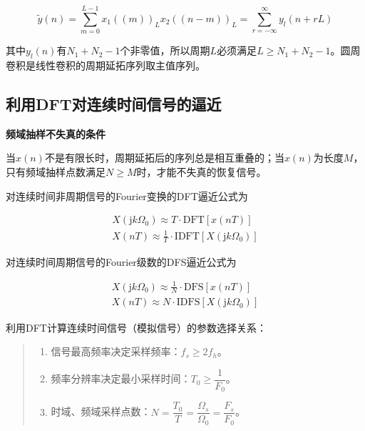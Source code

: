 \documentclass[cn, hazy, blue, normal, 12pt]{elegantnote}
\begin{document}
\begin{equation}
    \widetilde{y}(n)=\sum_{m=0}^{L-1}{x_1((m))_L x_2((n-m))_L}=\sum_{r=-\infty}^{\infty}{y_l(n+rL)}
\end{equation}

其中$y_l(n)$有$N_1+N_2-1$个非零值，所以周期$L$必须满足$L\geq N_1+N_2-1$。圆周卷积是线性卷积的周期延拓序列取主值序列。

\subsection{利用DFT对连续时间信号的逼近}

\textbf{频域抽样不失真的条件}

当$x(n)$不是有限长时，周期延拓后的序列总是相互重叠的；当$x(n)$为长度$M$，只有频域抽样点数满足$N\geq M$时，才能不失真的恢复信号。

对连续时间非周期信号的Fourier变换的DFT逼近公式为

\begin{equation}
\begin{aligned}
    X(\text{j}k\Omega_0)\approx T\cdot \text{DFT}[x(nT)] \\
    X(nT)\approx \frac{1}{T}\cdot \text{IDFT}[X(\text{j}k\Omega_0)]
\end{aligned}
\end{equation}

对连续时间周期信号的Fourier级数的DFS逼近公式为

\begin{equation}
\begin{aligned}
    X(\text{j}k\Omega_0)\approx \frac{1}{N}\cdot \text{DFS}[x(nT)] \\
    X(nT)\approx N\cdot \text{IDFS}[X(\text{j}k\Omega_0)]
\end{aligned}
\end{equation}

利用DFT计算连续时间信号（模拟信号）的参数选择关系：

\begin{quote}
\begin{enumerate}
    \item 信号最高频率决定采样频率：$f_s\geq 2f_h$。
    \item 频率分辨率决定最小采样时间：$T_0\geq \dfrac{1}{F_0}$。
    \item 时域、频域采样点数：$N=\dfrac{T_0}{T}=\dfrac{\Omega_s}{\Omega_0}=\dfrac{F_s}{F_0}$。
\end{enumerate}
\end{quote}
\end{document}
